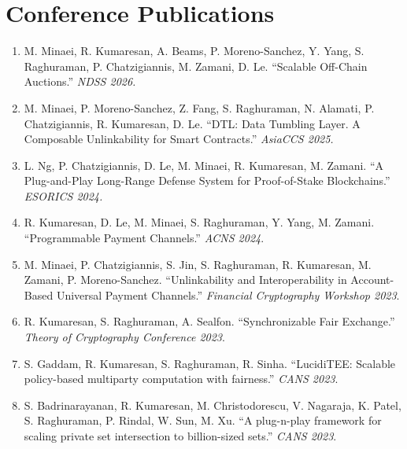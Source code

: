 \documentclass[11pt]{article}
\begin{document}
\section{Conference Publications}

\begin{enumerate}[leftmargin=*, itemsep=1pt]
    \item M. Minaei, R. Kumaresan, A. Beams, P. Moreno-Sanchez, Y. Yang, S. Raghuraman, P. Chatzigiannis, M. Zamani, D. Le. ``Scalable Off-Chain Auctions.'' \textit{NDSS 2026.}

    \item M. Minaei, P. Moreno-Sanchez, Z. Fang, S. Raghuraman, N. Alamati, P. Chatzigiannis, R. Kumaresan, D. Le. ``DTL: Data Tumbling Layer. A Composable Unlinkability for Smart Contracts.'' \textit{AsiaCCS 2025.}

    \item L. Ng, P. Chatzigiannis, D. Le, M. Minaei, R. Kumaresan, M. Zamani. ``A Plug-and-Play Long-Range Defense System for Proof-of-Stake Blockchains.'' \textit{ESORICS 2024.}
    
    \item R. Kumaresan, D. Le, M. Minaei, S. Raghuraman, Y. Yang, M. Zamani. ``Programmable Payment Channels.'' \textit{ACNS 2024}.
    
    \item M. Minaei, P. Chatzigiannis, S. Jin, S. Raghuraman, R. Kumaresan, M. Zamani, P. Moreno-Sanchez. ``Unlinkability and Interoperability in Account-Based Universal Payment Channels.'' \textit{Financial Cryptography Workshop 2023}.
    
    \item R. Kumaresan, S. Raghuraman, A. Sealfon. ``Synchronizable Fair Exchange.'' \textit{Theory of Cryptography Conference 2023}.
    
    \item S. Gaddam, R. Kumaresan, S. Raghuraman, R. Sinha. ``LucidiTEE: Scalable policy-based multiparty computation with fairness.'' \textit{CANS 2023}.
    
    \item S. Badrinarayanan, R. Kumaresan, M. Christodorescu, V. Nagaraja, K. Patel, S. Raghuraman, P. Rindal, W. Sun, M. Xu. ``A plug-n-play framework for scaling private set intersection to billion-sized sets.'' \textit{CANS 2023}.
    

\end{enumerate}
\end{document}
